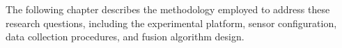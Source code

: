 \documentclass{erauthesis}
\begin{document}
The following chapter describes the methodology employed to address these research questions, including the experimental platform, sensor configuration, data collection procedures, and fusion algorithm design.




\end{document}
